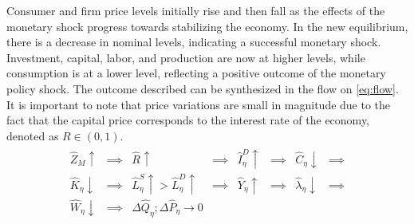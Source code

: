 \documentclass[../thesis.tex]{subfiles}
\begin{document}
	Consumer and firm price levels initially rise and then fall as the effects of the monetary shock progress towards stabilizing the economy. In the new equilibrium, there is a decrease in nominal levels, indicating a successful monetary shock. Investment, capital, labor, and production are now at higher levels, while consumption is at a lower level, reflecting a positive outcome of the monetary policy shock. The outcome described can be synthesized in the flow on \eqref{eq:flow}. It is important to note that price variations are small in magnitude due to the fact that the capital price corresponds to the interest rate of the economy, denoted as $R \in (0,1)$. %
	\begin{align}
		\begin{matrix}
			\hat{Z}_{M} \uparrow &\implies &\hat{R}_{}\uparrow &\implies &\hat{I}_{\eta}^D \uparrow &\implies &\hat{C}_{\eta} \downarrow &\implies \\
			\hat{K}_{\eta} \downarrow &\implies &\hat{L}_{\eta}^S \uparrow > \hat{L}_{\eta}^D \uparrow &\implies &\hat{Y}_{\eta} \uparrow &\implies &\hat{\lambda}_{\eta} \downarrow &\implies \\
			\hat{W}_{\eta} \downarrow &\implies & \Delta \hat{Q}_{\eta} ; \Delta \hat{P}_{\eta} \to 0 %
		\end{matrix} \label{eq:flow}
	\end{align}
	
	\begin{comment}

	\begin{alignat}{4}
	\hat{Z}_{M} \uparrow      &\implies \hat{R}_{}\uparrow                                    &\implies \hat{I}_{\eta}^D \uparrow &\implies \hat{C}_{\eta} \downarrow &\implies \nonumber \\
	\hat{K}_{\eta} \downarrow &\implies \hat{L}_{\eta}^S \uparrow > \hat{L}_{\eta}^D \uparrow &\implies \hat{W}_{\eta} \downarrow &\implies & \nonumber \\
	\hat{Y}_{\eta} \uparrow   &\implies \hat{\lambda}_{\eta} \downarrow                       &\implies \hat{Q}_{\eta} \uparrow \downarrow ; \hat{P}_{\eta} \uparrow \downarrow & \text{} & \label{flow2}
\end{alignat}


	\begin{matrix}
	\hat{Z}_{M}      \uparrow   \implies &
	\hat{R}_{}       \uparrow   \implies &
	\hat{I}_{\eta}^D \uparrow   \implies &
	\hat{C}_{\eta}   \downarrow \implies \\
	\hat{K}_{\eta}   \downarrow \implies &
	\hat{L}_{\eta}^S \uparrow > \hat{L}_{\eta}^D \uparrow   \implies &
	\hat{W}_{\eta}   \downarrow \implies &
	\hat{Y}_{\eta}   \uparrow   \implies \\
	\hat{\lambda}_{\eta} \downarrow \implies &
	\hat{Q}_{\eta} \uparrow \downarrow \implies &
	\hat{P}_{\eta} \uparrow \downarrow & \text{}
\end{matrix} \label{flow}

	\end{comment}
	
\end{document}
